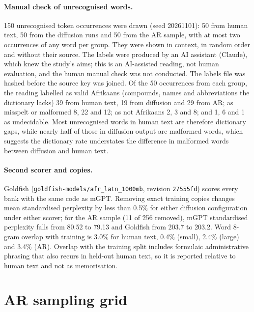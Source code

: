 \documentclass[11pt,a4paper]{article}
\begin{document}
\paragraph{Manual check of unrecognised words.} 150 unrecognised token occurrences were drawn (seed 20261101): 50 from human text, 50 from the diffusion runs and 50 from the AR sample, with at most two occurrences of any word per group. They were shown in context, in random order and without their source. The labels were produced by an AI assistant (Claude), which knew the study's aims; this is an AI-assisted reading, not human evaluation, and the human manual check was not conducted. The labels file was hashed before the source key was joined. Of the 50 occurrences from each group, the reading labelled as valid Afrikaans (compounds, names and abbreviations the dictionary lacks) 39 from human text, 19 from diffusion and 29 from AR; as misspelt or malformed 8, 22 and 12; as not Afrikaans 2, 3 and 8; and 1, 6 and 1 as undecidable. Most unrecognised words in human text are therefore dictionary gaps, while nearly half of those in diffusion output are malformed words, which suggests the dictionary rate understates the difference in malformed words between diffusion and human text.

\paragraph{Second scorer and copies.} Goldfish (\texttt{goldfish-models/afr\_latn\_1000mb}, revision \texttt{27555fd}) scores every bank with the same code as mGPT. Removing exact training copies changes mean standardised perplexity by less than 0.5\% for either diffusion configuration under either scorer; for the AR sample (11 of 256 removed), mGPT standardised perplexity falls from 80.52 to 79.13 and Goldfish from 203.7 to 203.2. Word 8-gram overlap with training is 3.0\% for human text, 0.4\% (small), 2.4\% (large) and 3.4\% (AR). Overlap with the training split includes formulaic administrative phrasing that also recurs in held-out human text, so it is reported relative to human text and not as memorisation.

\section{AR sampling grid}
\label{app:argrid}
\end{document}
